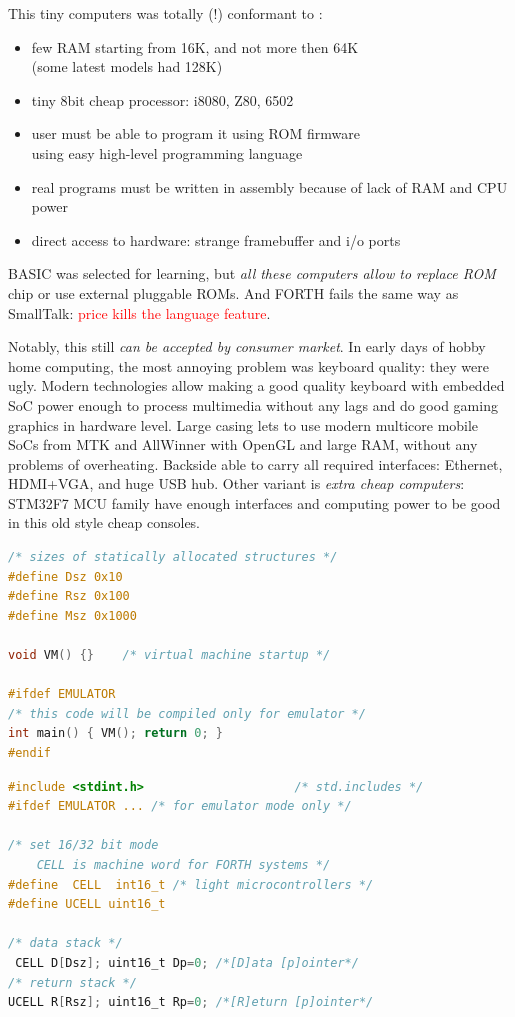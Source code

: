 \noindent
This tiny computers was totally (!) conformant to \F:
\begin{itemize}[nosep]
  \item few RAM starting from 16K, and not more then 64K\\
  (some latest models had 128K)
  \item tiny 8bit cheap processor: i8080, Z80, 6502
  \item user must be able to program it using ROM firmware\\using easy
  high-level programming language
  \item real programs must be written in assembly because of lack of RAM
  and CPU power
  \item direct access to hardware: strange framebuffer and i/o ports
\end{itemize}
BASIC was selected for learning, but \emph{all these computers allow to replace
ROM} chip or use external pluggable ROMs. And FORTH fails the same way as
SmallTalk: \textcolor{red}{price kills the language feature}.

\clearpage

\noindent
Notably, this  still \emph{can be accepted
by consumer market}. In early days of hobby home computing, the most annoying
problem was keyboard quality: they were ugly. Modern technologies allow making a
good quality keyboard with embedded SoC power enough to process multimedia
without any lags and do good gaming graphics in hardware level. Large casing
lets to use modern multicore mobile SoCs from MTK and AllWinner with OpenGL
and large RAM, without any problems of overheating. Backside able to carry all
required interfaces: Ethernet, HDMI+VGA, and huge USB hub.
Other variant is \emph{extra cheap computers}: STM32F7 MCU family
have enough interfaces and computing power to be good in this old style cheap
consoles.

\clearpage

\begin{lstlisting}[language=C]
/* sizes of statically allocated structures */
#define Dsz 0x10
#define Rsz 0x100
#define Msz 0x1000

void VM() {}	/* virtual machine startup */

#ifdef EMULATOR
/* this code will be compiled only for emulator */
int main() { VM(); return 0; }
#endif
\end{lstlisting}
\begin{lstlisting}[language=C]
#include <stdint.h>						/* std.includes */
#ifdef EMULATOR ...	/* for emulator mode only */

/* set 16/32 bit mode
	CELL is machine word for FORTH systems */
#define  CELL  int16_t /* light microcontrollers */
#define UCELL uint16_t

/* data stack */
 CELL D[Dsz]; uint16_t Dp=0; /*[D]ata [p]ointer*/
/* return stack */
UCELL R[Rsz]; uint16_t Rp=0; /*[R]eturn [p]ointer*/
\end{lstlisting}

